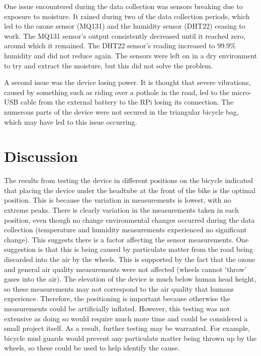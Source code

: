 \documentclass[11pt]{report}
\begin{document}
One issue encountered during the data collection was sensors breaking due to exposure to moisture. It rained during two of the data collection periods, which led to the ozone sensor (MQ131) and the humidity sensor (DHT22) ceasing to work. The MQ131 sensor's output consistently decreased until it reached zero, around which it remained. The DHT22 sensor's reading increased to 99.9\% humidity and did not reduce again. The sensors were left on in a dry environment to try and extract the moisture, but this did not solve the problem.

A second issue was the device losing power. It is thought that severe vibrations, caused by something such as riding over a pothole in the road, led to the micro-USB cable from the external battery to the RPi losing its connection. The numerous parts of the device were not secured in the triangular bicycle bag, which may have led to this issue occurring.

\section{Discussion}

The results from testing the device in different positions on the bicycle indicated that placing the device under the headtube at the front of the bike is the optimal position. This is because the variation in measurements is lowest, with no extreme peaks. There is clearly variation in the measurements taken in each position, even though no change environmental changes occurred during the data collection (temperature and humidity measurements experienced no significant change). This suggests there is a factor affecting the sensor measurements. One suggestion is that this is being caused by particulate matter from the road being discarded into the air by the wheels. This is supported by the fact that the ozone and general air quality measurements were not affected (wheels cannot `throw' gases into the air). The elevation of the device is much below human head height, so these measurements may not correspond to the air quality that humans experience. Therefore, the positioning is important because otherwise the measurements could be artificially inflated. However, this testing was not extensive as doing so would require much more time and could be considered a small project itself. As a result, further testing may be warranted. For example, bicycle mud guards would prevent any particulate matter being thrown up by the wheels, so these could be used to help identify the cause.
\end{document}
